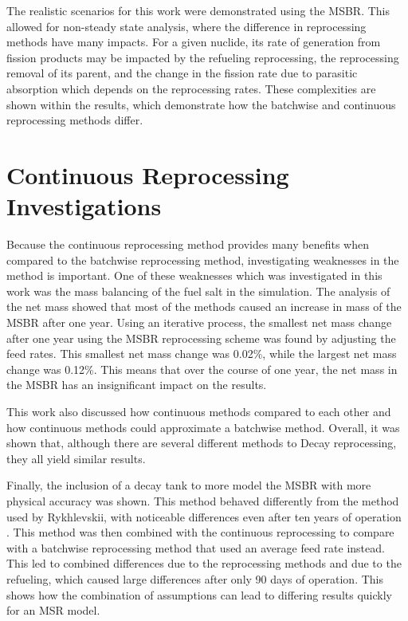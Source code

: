 The realistic scenarios for this work were demonstrated using the MSBR.
This allowed for non-steady state analysis, where the difference in reprocessing methods have many impacts.
For a given nuclide, its rate of generation from fission products may be impacted by the refueling reprocessing, the reprocessing removal of its parent, and the change in the fission rate due to parasitic absorption which depends on the reprocessing rates.
These complexities are shown within the results, which demonstrate how the batchwise and continuous reprocessing methods differ.

\section{Continuous Reprocessing Investigations}

Because the continuous reprocessing method provides many benefits when compared to the batchwise reprocessing method, investigating weaknesses in the method is important.
One of these weaknesses which was investigated in this work was the mass balancing of the fuel salt in the simulation.
The analysis of the net mass showed that most of the methods caused an increase in mass of the MSBR after one year.
Using an iterative process, the smallest net mass change after one year using the MSBR reprocessing scheme was found by adjusting the feed rates.
This smallest net mass change was 0.02\%, while the largest net mass change was 0.12\%.
This means that over the course of one year, the net mass in the MSBR has an insignificant impact on the results.

This work also discussed how continuous methods compared to each other and how continuous methods could approximate a batchwise method.
Overall, it was shown that, although there are several different methods to Decay reprocessing, they all yield similar results.

Finally, the inclusion of a decay tank to more model the MSBR with more physical accuracy was shown.
This method behaved differently from the method used by Rykhlevskii, with noticeable differences even after ten years of operation \cite{rykhlevskii_advanced_2018}.
This method was then combined with the continuous reprocessing to compare with a batchwise reprocessing method that used an average feed rate instead.
This led to combined differences due to the reprocessing methods and due to the refueling, which caused large differences after only 90 days of operation.
This shows how the combination of assumptions can lead to differing results quickly for an MSR model.


